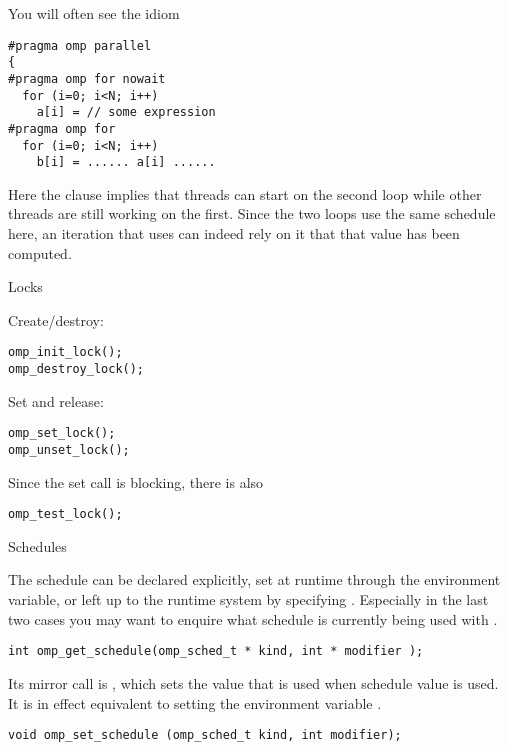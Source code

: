 You will often see the idiom
\begin{verbatim}
#pragma omp parallel
{
#pragma omp for nowait
  for (i=0; i<N; i++)
    a[i] = // some expression
#pragma omp for
  for (i=0; i<N; i++)
    b[i] = ...... a[i] ......
\end{verbatim}
Here the  clause implies that threads can start on the second loop
while other threads are still working on the first. Since the two loops use the same
schedule here, an iteration that uses  can indeed rely on it that that 
value has been computed.

 {Locks}

Create/destroy:
\begin{verbatim}
omp_init_lock();
omp_destroy_lock();
\end{verbatim}
Set and release:
\begin{verbatim}
omp_set_lock();
omp_unset_lock();
\end{verbatim}
Since the set call is blocking, there is also 
\begin{verbatim}
omp_test_lock();
\end{verbatim}

 {Schedules}

The schedule can be declared explicitly, set at runtime
through the  environment variable, or left up to the runtime system
by specifying . Especially in the last two cases  you may want to enquire
what schedule is currently being used with
.
\begin{verbatim}
int omp_get_schedule(omp_sched_t * kind, int * modifier );
\end{verbatim}

Its mirror call is , which sets the
value that is used when schedule value  is used. It is in
effect equivalent to setting the environment variable
.
\begin{verbatim}
void omp_set_schedule (omp_sched_t kind, int modifier);
\end{verbatim}

